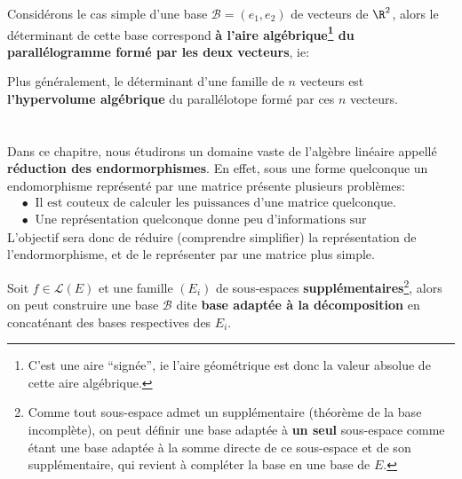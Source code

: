 Considérons le cas simple d'une base \(\mathscr{B} = (e_1, e_2)\) de vecteurs de \(\R^2\), alors le déterminant de cette base correspond \textbf{à l'aire algébrique\footnote[1]{C'est une aire ``signée'', ie l'aire géométrique est donc la valeur absolue de cette aire algébrique.} du parallélogramme formé par les deux vecteurs}, ie:
\begin{center}
\end{center}
Plus généralement, le déterminant d'une famille de \(n\) vecteurs est \textbf{l'hypervolume algébrique} du parallélotope formé par ces \(n\) vecteurs.

\chapter*{}
Dans ce chapitre, nous étudirons un domaine vaste de l'algèbre linéaire appellé \textbf{réduction des endormorphismes}.\+
En effet, sous une forme quelconque un endomorphisme représenté par une matrice présente plusieurs problèmes:
\begin{align*}
   &\bullet \;\; \text{Il est couteux de calculer les puissances d'une matrice quelconque.} \\
   &\bullet \;\; \text{Une représentation quelconque donne peu d'informations sur l'endomorphisme.}
\end{align*}
L'objectif sera donc de réduire (comprendre simplifier) la représentation de l'endormorphisme, et de le représenter par une matrice plus simple. \<

Soit \(f \in \mathcal{L}(E)\) et une famille \((E_i)\) de sous-espaces \textbf{supplémentaires}\footnote[1]{Comme tout sous-espace admet un supplémentaire (théorème de la base incomplète), on peut définir une base adaptée à \textbf{un seul} sous-espace comme étant une base adaptée à la somme directe de ce sous-espace et de son supplémentaire, qui revient à compléter la base en une base de \(E\).}, alors on peut construire une base \(\mathcal{B}\) dite \textbf{base adaptée à la décomposition} en concaténant des bases respectives des \(E_i\).

